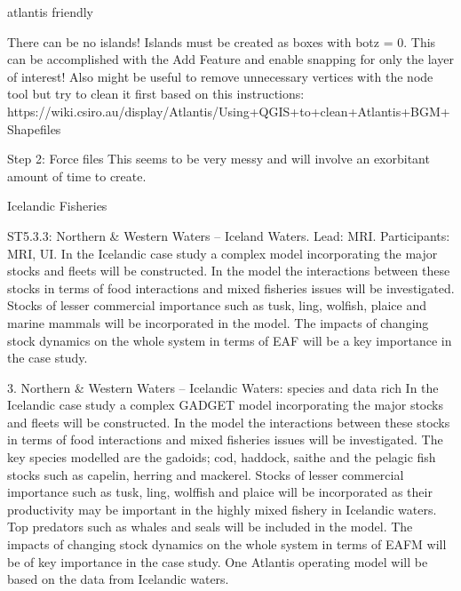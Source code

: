 \documentclass{report}
\begin{document}
atlantis friendly


There can be no islands! Islands must be created as boxes with botz = 0. This can be accomplished with the Add Feature and enable snapping for only the layer of interest! Also might be useful to remove unnecessary vertices with the node tool but try to clean it first based on this instructions: https://wiki.csiro.au/display/Atlantis/Using+QGIS+to+clean+Atlantis+BGM+Shapefiles

Step 2: Force files
This seems to be very messy and will involve an exorbitant amount of time to create.







Icelandic Fisheries

ST5.3.3: Northern \& Western Waters – Iceland Waters. Lead: MRI. Participants: MRI, UI.
In the Icelandic case study a complex model incorporating the major stocks and fleets will be constructed. In the model the interactions between these stocks in terms of food interactions and mixed fisheries issues will be investigated. Stocks of lesser commercial importance such as tusk, ling, wolfish, plaice and marine mammals will be incorporated in the model. The impacts of changing stock dynamics on the whole system in terms of EAF will be a key importance in the case study.

3. Northern \& Western Waters – Icelandic Waters: species and data rich
In the Icelandic case study a complex GADGET model incorporating the major stocks and fleets will be constructed. In the model the interactions between these stocks in terms of food interactions and mixed fisheries issues will be investigated. The key species modelled are the gadoids; cod, haddock, saithe and the pelagic fish stocks such as capelin, herring and mackerel. Stocks of lesser commercial importance such as tusk, ling, wolffish and plaice will be incorporated as their productivity may be important in the highly mixed fishery in Icelandic
waters. Top predators such as whales and seals will be included in the model. The impacts of changing stock dynamics on the whole system in terms of EAFM will be of key importance in the case study. One Atlantis operating model will be based on the data from Icelandic waters.
\end{document}
